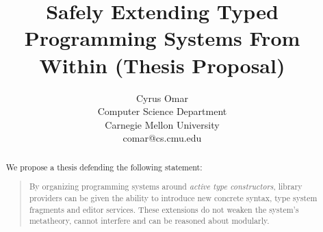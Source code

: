 \documentclass[10pt]{article}
\title{Safely Extending Typed Programming Systems From Within (Thesis Proposal)}
\author{Cyrus Omar\\
 Computer Science Department\\
 Carnegie Mellon University\\
 comar@cs.cmu.edu}
\date{}                                           %
\begin{document}
\maketitle

\begin{abstract}
\noindent


We propose a thesis defending the following statement:
\begin{quote}
{By organizing programming systems around \emph{active type constructors}, library providers can be given the ability to introduce new concrete syntax, type system fragments and editor services. These extensions do not weaken the system's metatheory, cannot interfere and can be reasoned about modularly.}
\end{quote}
\end{abstract}\vspace{-5px}

\sloppy

\begin{center}



\normalsize
\end{center}
\end{document}
